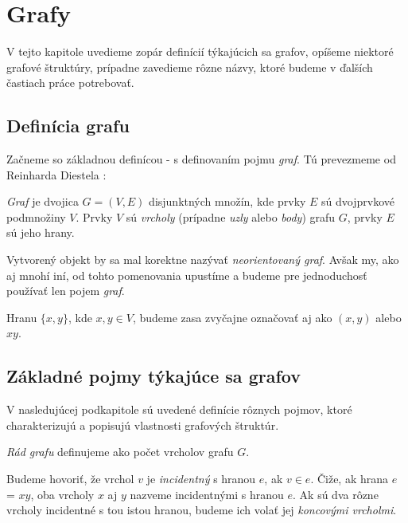 \chapter{Grafy}
\label{kap:grafy}

V tejto kapitole uvedieme zopár definícií týkajúcich sa grafov, opíšeme niektoré grafové štruktúry, prípadne zavedieme rôzne názvy, ktoré budeme v ďalších častiach práce potrebovať.


\section{Definícia grafu}

Začneme so základnou definícou - s definovaním pojmu \textit{graf}. Tú prevezmeme od Reinharda Diestela \cite[kapitola 0.1]{Diestel2000}: \newline

\textit{Graf} je dvojica $G = (V, E)$ disjunktných množín, kde prvky $E$ sú dvojprvkové podmnožiny $V$. Prvky $V$ sú \textit{vrcholy} (prípadne \textit{uzly} alebo \textit{body}) grafu $G$, prvky $E$ sú jeho hrany. \newline

Vytvorený objekt by sa mal korektne nazývať \textit{neorientovaný graf}. Avšak my, ako aj mnohí iní, od tohto pomenovania upustíme a budeme pre jednoduchosť používať len pojem \textit{graf}.\newline

Hranu $\{x, y\}$, kde $x,y\in V$, budeme zasa zvyčajne označovať aj ako $(x, y)$ alebo $xy$.


\section{Základné pojmy týkajúce sa grafov}

V nasledujúcej podkapitole sú uvedené definície rôznych pojmov, ktoré charakterizujú a popisujú vlastnosti grafových štruktúr.\newline

\textit{Rád grafu} definujeme ako počet vrcholov grafu $G$.\newline

Budeme hovoriť, že vrchol $v$ je \textit{incidentný} s hranou $e$, ak $v \in e$. Čiže, ak hrana $e$ = $xy$, oba vrcholy $x$ aj $y$ nazveme incidentnými s hranou $e$. Ak sú dva rôzne vrcholy incidentné s tou istou hranou, budeme ich volať jej \textit{koncovými vrcholmi}.\newline

